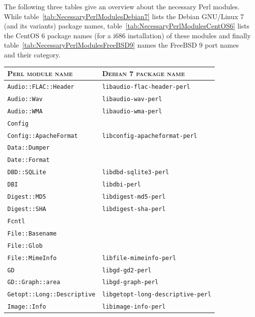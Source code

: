 \documentclass[a4paper,oneside,10pt]{report}
\begin{document}
The following three tables give an overview about the necessary Perl modules. While table~\ref{tab:NecessaryPerlModulesDebian7} lists the Debian GNU/Linux 7 (and its variants) package names, table~\ref{tab:NecessaryPerlModulesCentOS6} lists the CentOS 6 package names (for a i686 installation) of these modules and finally table~\ref{tab:NecessaryPerlModulesFreeBSD9} names the FreeBSD 9 port names and their category.

\begin{table}
	\centering
	\begin{tabular}{|p{15em}|p{18em}|}
		\hline
		\textsc{Perl module name} 						& \textsc{Debian 7 package name} \\
		\hline
		\hline
		\verb|Audio::FLAC::Header| 						& \verb|libaudio-flac-header-perl| \\
		\hline
		\verb|Audio::Wav| 										& \verb|libaudio-wav-perl| \\
		\hline
		\verb|Audio::WMA| 										& \verb|libaudio-wma-perl| \\
		\hline
		\verb|Config| 												& \\
		\hline
		\verb|Config::ApacheFormat|						& \verb|libconfig-apacheformat-perl| \\
		\hline
		\verb|Data::Dumper| 									& \\
		\hline
		\verb|Date::Format| 									& \\
		\hline
		\verb|DBD::SQLite|										& \verb|libdbd-sqlite3-perl| \\
		\hline
		\verb|DBI|														& \verb|libdbi-perl| \\
		\hline
		\verb|Digest::MD5| 										& \verb|libdigest-md5-perl| \\
		\hline
		\verb|Digest::SHA| 										& \verb|libdigest-sha-perl| \\
		\hline
		\verb|Fcntl| 													& \\
		\hline
		\verb|File::Basename| 								& \\
		\hline
		\verb|File::Glob| 										& \\
		\hline
		\verb|File::MimeInfo| 								& \verb|libfile-mimeinfo-perl| \\
		\hline
		\verb|GD| 														& \verb|libgd-gd2-perl| \\
		\hline
		\verb|GD::Graph::area| 								& \verb|libgd-graph-perl| \\
		\hline
		\verb|Getopt::Long::Descriptive| 			& \verb|libgetopt-long-descriptive-perl| \\
		\hline
		\verb|Image::Info| 										& \verb|libimage-info-perl| \\

\end{tabular}
\end{table}
\end{document}
